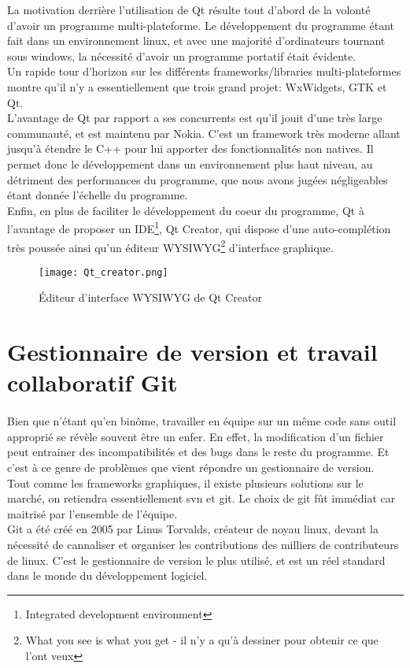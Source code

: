         La motivation derrière l'utilisation de Qt résulte tout d'abord de la volonté d'avoir un programme multi-plateforme. Le développement du programme étant fait dans un environnement linux, et avec une majorité d'ordinateurs tournant sous windows, la nécessité d'avoir un programme portatif était évidente.
        \\ Un rapide tour d'horizon sur les différents frameworks/libraries multi-plateformes montre qu'il n'y a essentiellement que trois grand projet: WxWidgets, GTK et Qt.
        \\ L'avantage de Qt par rapport a ses concurrents est qu'il jouit d'une très large communauté, et est maintenu par Nokia. C'est un framework très moderne allant jusqu'à étendre le C++ pour lui apporter des fonctionnalités non natives. Il permet donc le développement dans un environnement plus haut niveau, au détriment des performances du programme, que nous avons jugées négligeables étant donnée l'échelle du programme.
        \\ Enfin, en plus de faciliter le développement du coeur du programme, Qt à l'avantage de proposer un IDE\footnote{Integrated development environment}, Qt Creator, qui dispose d'une auto-complétion très poussée ainsi qu'un éditeur WYSIWYG\footnote{What you see is what you get - il n'y a qu'à dessiner pour obtenir ce que l'ont veux} d'interface graphique.

        \begin{figure}[h]
            \begin{center}
                \texttt{[image: Qt\_creator.png]}
            \end{center}

            \caption{Éditeur d'interface WYSIWYG de Qt Creator}
            \label{Qt Creator}
        \end{figure}

    \newpage

    \section{Gestionnaire de version et travail collaboratif Git}
        \paragraph{}
            Bien que n'étant qu'en binôme, travailler en équipe sur un même code sans outil approprié se révèle souvent être un enfer. En effet, la modification d'un fichier peut entrainer des incompatibilités et des bugs dans le reste du programme. Et c'est à ce genre de problèmes que vient répondre un gestionnaire de version.
            \\ Tout comme les frameworks graphiques, il existe plusieurs solutions sur le marché, on retiendra essentiellement svn et git. Le choix de git fût immédiat car maitrisé par l'ensemble de l'équipe. 
            \\ Git a été créé en 2005 par Linus Torvalds, créateur de noyau linux, devant la nécessité de cannaliser et organiser les contributions des milliers de contributeurs de linux. C'est le gestionnaire de version le plus utilisé, et est un réel standard dans le monde du développement logiciel.

